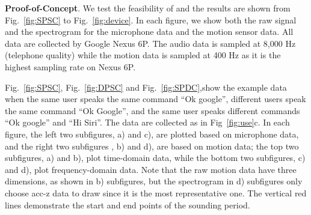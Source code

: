 \textbf{Proof-of-Concept}.
We test the feasibility of {\shortname} and the results are shown from Fig.~\ref{fig:SPSC} to Fig.~\ref{fig:device}. In each figure, we show both the raw signal and the spectrogram for the microphone data and the motion sensor data. All data are collected by Google Nexus 6P. The audio data is sampled at  8,000 Hz (telephone quality) while the motion data is sampled at 400 Hz as it is the highest sampling rate on Nexus 6P.


Fig.~\ref{fig:SPSC}, Fig.~\ref{fig:DPSC}  and  Fig.~\ref{fig:SPDC},show the example data when the same user speaks the same command ``Ok google'', different users speak the same command ``Ok Google'', and the same user speaks different commands ``Ok google'' and ``Hi Siri''. The data are collected as in Fig~\ref{fig:use}c.  In each figure, the left two subfigures, a) and c), are plotted based on microphone data, and the right two subfigures , b) and d),  are based on motion data; the top two subfigures, a) and b), plot time-domain data, while the bottom  two subfigures, c) and d), plot frequency-domain data. Note that the raw motion data have three dimensions, as shown in b) subfigures, but the spectrogram in d) subfigures only choose acc-z data to draw since it is the most representative one. The vertical red lines demonstrate the start and end points of the sounding period.

